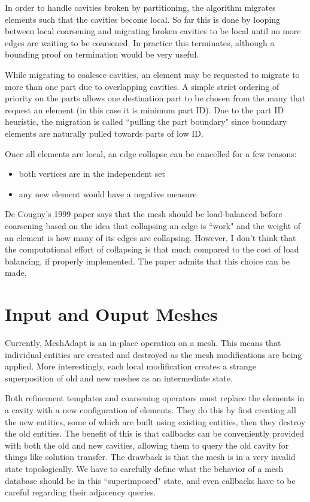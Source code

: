 \documentclass{article}
\begin{document}
In order to handle cavities broken by partitioning, the
algorithm migrates elements such that the cavities become local.
So far this is done by looping between local coarsening and
migrating broken cavities to be local until no more
edges are waiting to be coarsened.
In practice this terminates, although a bounding proof
on termination would be very useful.

While migrating to coalesce cavities, an element may be
requested to migrate to more than one part due to overlapping
cavities.
A simple strict ordering of priority on the parts allows
one destination part to be chosen from the many that request
an element (in this case it is minimum part ID).
Due to the part ID heuristic, the migration is called
``pulling the part boundary" since boundary elements are
naturally pulled towards parts of low ID.

Once all elements are local, an edge collapse can be
cancelled for a few reasons:
\begin{itemize}
\item both vertices are in the independent set
\item any new element would have a negative measure
\end{itemize}

De Cougny's 1999 paper says that the mesh should be
load-balanced before coarsening based on the idea
that collapsing an edge is ``work" and the weight
of an element is how many of its edges are collapsing.
However, I don't think that the computational effort
of collapsing is that much compared to the cost
of load balancing, if properly implemented.
The paper admits that this choice can be made.

\section{Input and Ouput Meshes}

Currently, MeshAdapt is an in-place operation on a mesh.
This means that individual entities are created and destroyed
as the mesh modifications are being applied.
More interestingly, each local modification creates a strange
superposition of old and new meshes as an intermediate state.

Both refinement templates and coarsening operators must replace
the elements in a cavity with a new configuration of elements.
They do this by first creating all the new entities, some of which
are built using existing entities, then they destroy the old
entities.
The benefit of this is that callbacks can be conveniently
provided with both the old and new cavities, allowing them
to query the old cavity for things like solution transfer.
The drawback is that the mesh is in a very
invalid state topologically.
We have to carefully define what the behavior of a mesh database
should be in this ``superimposed" state, and even callbacks
have to be careful regarding their adjacency queries.
\end{document}
